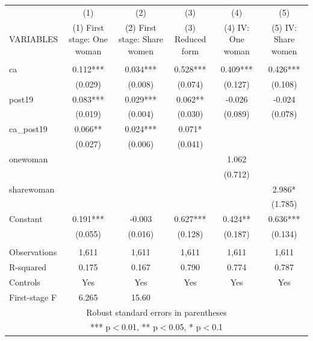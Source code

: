 \begin{tabular}{lccccc} \hline
 & (1) & (2) & (3) & (4) & (5) \\
VARIABLES & (1) First stage: One woman & (2) First stage: Share women & (3) Reduced form & (4) IV: One woman & (5) IV: Share women \\ \hline
 &  &  &  &  &  \\
ca & 0.112*** & 0.034*** & 0.528*** & 0.409*** & 0.426*** \\
 & (0.029) & (0.008) & (0.074) & (0.127) & (0.108) \\
post19 & 0.083*** & 0.029*** & 0.062** & -0.026 & -0.024 \\
 & (0.019) & (0.004) & (0.030) & (0.089) & (0.078) \\
ca\_post19 & 0.066** & 0.024*** & 0.071* &  &  \\
 & (0.027) & (0.006) & (0.041) &  &  \\
onewoman &  &  &  & 1.062 &  \\
 &  &  &  & (0.712) &  \\
sharewoman &  &  &  &  & 2.986* \\
 &  &  &  &  & (1.785) \\
Constant & 0.191*** & -0.003 & 0.627*** & 0.424** & 0.636*** \\
 & (0.055) & (0.016) & (0.128) & (0.187) & (0.134) \\
 &  &  &  &  &  \\
Observations & 1,611 & 1,611 & 1,611 & 1,611 & 1,611 \\
R-squared & 0.175 & 0.167 & 0.790 & 0.774 & 0.787 \\
Controls & Yes & Yes & Yes & Yes & Yes \\
 First-stage F & 6.265 & 15.60 &  &  &  \\ \hline
\multicolumn{6}{c}{ Robust standard errors in parentheses} \\
\multicolumn{6}{c}{ *** p$<$0.01, ** p$<$0.05, * p$<$0.1} \\
\end{tabular}
